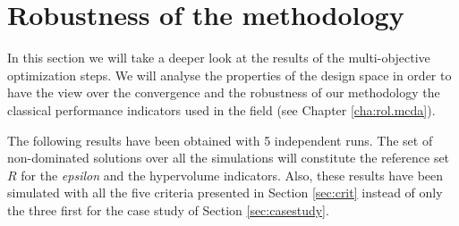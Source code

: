 \section{Robustness of the methodology}
\label{sec:robustness}




In this section we will take a deeper look at the results of the multi-objective optimization steps. We will analyse the properties of the design space in order to have the view over the convergence and the robustness of our methodology the classical performance indicators used in the field (see Chapter \ref{cha:rol.mcda}).

The following results have been obtained with 5 independent runs. The set of non-dominated solutions over all the simulations will constitute the reference set $R$ for the \textit{epsilon} and the hypervolume indicators. Also, these results have been simulated with all the five criteria presented in Section \ref{sec:crit} instead of only the three first for the case study of Section \ref{sec:casestudy}.



